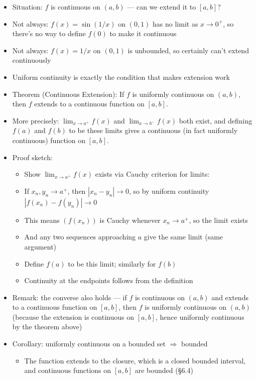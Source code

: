\documentclass[
  10pt,
  letterpaper,
]{scrbook}
\providecommand{\tightlist}{%
  \setlength{\itemsep}{0pt}\setlength{\parskip}{0pt}}
\begin{document}
\begin{itemize}
\tightlist
\item
  Situation: \(f\) is continuous on \((a, b)\) --- can we extend it to
  \([a, b]\)?
\item
  Not always: \(f(x) = \sin(1/x)\) on \((0, 1)\) has no limit as
  \(x \to 0^+\), so there's no way to define \(f(0)\) to make it
  continuous
\item
  Not always: \(f(x) = 1/x\) on \((0, 1)\) is unbounded, so certainly
  can't extend continuously
\item
  Uniform continuity is exactly the condition that makes extension work
\item
  Theorem (Continuous Extension): If \(f\) is uniformly continuous on
  \((a, b)\), then \(f\) extends to a continuous function on \([a, b]\).
\item
  More precisely: \(\lim_{x \to a^+} f(x)\) and
  \(\lim_{x \to b^-} f(x)\) both exist, and defining \(f(a)\) and
  \(f(b)\) to be these limits gives a continuous (in fact uniformly
  continuous) function on \([a, b]\).
\item
  Proof sketch:

  \begin{itemize}
  \tightlist
  \item
    Show \(\lim_{x \to a^+} f(x)\) exists via Cauchy criterion for
    limits:
  \item
    If \(x_n, y_n \to a^+\), then \(|x_n - y_n| \to 0\), so by uniform
    continuity \(|f(x_n) - f(y_n)| \to 0\)
  \item
    This means \((f(x_n))\) is Cauchy whenever \(x_n \to a^+\), so the
    limit exists
  \item
    And any two sequences approaching \(a\) give the same limit (same
    argument)
  \item
    Define \(f(a)\) to be this limit; similarly for \(f(b)\)
  \item
    Continuity at the endpoints follows from the definition
  \end{itemize}
\item
  Remark: the converse also holds --- if \(f\) is continuous on
  \((a,b)\) and extends to a continuous function on \([a,b]\), then
  \(f\) is uniformly continuous on \((a,b)\) (because the extension is
  continuous on \([a,b]\), hence uniformly continuous by the theorem
  above)
\item
  Corollary: uniformly continuous on a bounded set \(\Rightarrow\)
  bounded

  \begin{itemize}
  \tightlist
  \item
    The function extends to the closure, which is a closed bounded
    interval, and continuous functions on \([a,b]\) are bounded (§6.4)
  \end{itemize}
\end{itemize}
\end{document}
